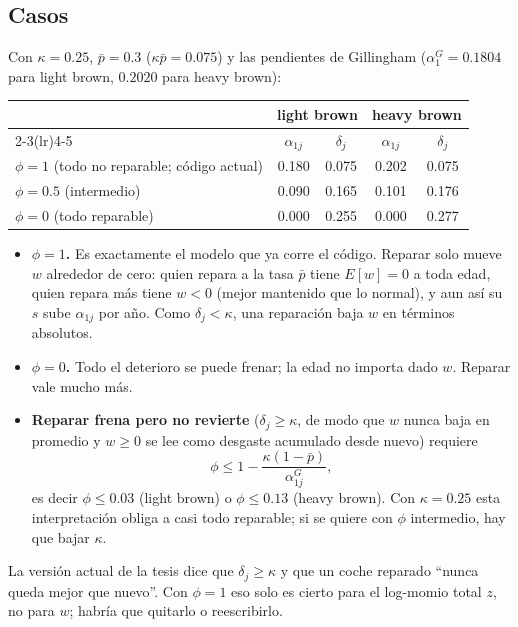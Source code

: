 \documentclass{article}
\begin{document}
\subsection{Casos}

Con $\kappa=0.25$, $\bar{p}=0.3$ ($\kappa\bar{p}=0.075$) y las pendientes de Gillingham ($\alpha^G_1=0.1804$ para light brown, $0.2020$ para heavy brown):

\begin{center}
\begin{tabular}{lcccc}
\toprule
 & \multicolumn{2}{c}{light brown} & \multicolumn{2}{c}{heavy brown}\\
\cmidrule(lr){2-3}\cmidrule(lr){4-5}
 & $\alpha_{1j}$ & $\delta_j$ & $\alpha_{1j}$ & $\delta_j$\\
\midrule
$\phi=1$ (todo no reparable; código actual) & 0.180 & 0.075 & 0.202 & 0.075\\
$\phi=0.5$ (intermedio) & 0.090 & 0.165 & 0.101 & 0.176\\
$\phi=0$ (todo reparable) & 0.000 & 0.255 & 0.000 & 0.277\\
\bottomrule
\end{tabular}
\end{center}

\begin{itemize}
    \item \textbf{$\phi=1$.} Es exactamente el modelo que ya corre el código. Reparar solo mueve $w$ alrededor de cero: quien repara a la tasa $\bar{p}$ tiene $E[w]=0$ a toda edad, quien repara más tiene $w<0$ (mejor mantenido que lo normal), y aun así su $s$ sube $\alpha_{1j}$ por año. Como $\delta_j<\kappa$, una reparación baja $w$ en términos absolutos.
    \item \textbf{$\phi=0$.} Todo el deterioro se puede frenar; la edad no importa dado $w$. Reparar vale mucho más.
    \item \textbf{Reparar frena pero no revierte} ($\delta_j\ge\kappa$, de modo que $w$ nunca baja en promedio y $w\ge0$ se lee como desgaste acumulado desde nuevo) requiere
    $$\phi\le 1-\frac{\kappa(1-\bar{p})}{\alpha^G_{1j}},$$
    es decir $\phi\le0.03$ (light brown) o $\phi\le0.13$ (heavy brown). Con $\kappa=0.25$ esta interpretación obliga a casi todo reparable; si se quiere con $\phi$ intermedio, hay que bajar $\kappa$.
\end{itemize}

La versión actual de la tesis dice que $\delta_j\ge\kappa$ y que un coche reparado ``nunca queda mejor que nuevo''. Con $\phi=1$ eso solo es cierto para el log-momio total $z$, no para $w$; habría que quitarlo o reescribirlo.
\end{document}
